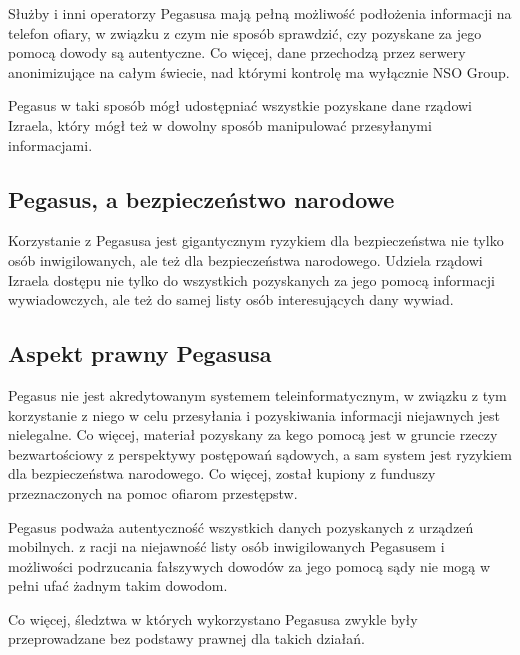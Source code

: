 \documentclass{article}
\begin{document}
Służby i inni operatorzy Pegasusa mają pełną możliwość podłożenia informacji na telefon ofiary, w związku z czym nie sposób sprawdzić, czy pozyskane za jego pomocą dowody są autentyczne. Co więcej, dane przechodzą przez serwery anonimizujące na całym świecie, nad którymi kontrolę ma wyłącznie NSO Group.

Pegasus w taki sposób mógł udostępniać wszystkie pozyskane dane rządowi Izraela, który mógł też w dowolny sposób manipulować przesyłanymi informacjami.

\subsection{Pegasus, a bezpieczeństwo narodowe}

Korzystanie z Pegasusa jest gigantycznym ryzykiem dla bezpieczeństwa nie tylko osób inwigilowanych, ale też dla bezpieczeństwa narodowego. Udziela rządowi Izraela dostępu nie tylko do wszystkich pozyskanych za jego pomocą informacji wywiadowczych, ale też do samej listy osób interesujących dany wywiad.

\subsection{Aspekt prawny Pegasusa}

Pegasus nie jest akredytowanym systemem teleinformatycznym, w związku z tym korzystanie z niego w celu przesyłania i pozyskiwania informacji niejawnych jest nielegalne. Co więcej, materiał pozyskany za kego pomocą jest w gruncie rzeczy bezwartościowy z perspektywy postępowań sądowych, a sam system jest ryzykiem dla bezpieczeństwa narodowego. Co więcej, został kupiony z funduszy przeznaczonych na pomoc ofiarom przestępstw.

Pegasus podważa autentyczność wszystkich danych pozyskanych z urządzeń mobilnych. z racji na niejawność listy osób inwigilowanych Pegasusem i możliwości podrzucania fałszywych dowodów za jego pomocą sądy nie mogą w pełni ufać żadnym takim dowodom.

Co więcej, śledztwa w których wykorzystano Pegasusa zwykle były przeprowadzane bez podstawy prawnej dla takich działań.
\end{document}
